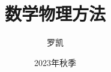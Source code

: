 \documentclass{beamer}
\title{数学物理方法}
\author[罗凯 NJUST]{罗凯}
\institute[*]{南京理工大学理学院\\
kluo@njust.edu.cn}
\date{2023年秋季}
\begin{document}






\begin{frame}
    \titlepage	%
\end{frame}

\begin{frame}[t]
    \tableofcontents
\end{frame}







\end{document}
